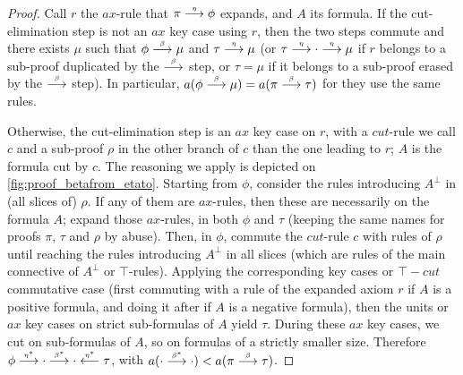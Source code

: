 \documentclass{lmcs}
\newcommand*{\orth}{^\perp} %
\newenvironment{myscope}{
\begin{scope}[every node/.style={circle,thick,draw,minimum size=8mm,inner sep=0}, every edge/.style={->,draw=black,thick}, every path/.style={-,draw=black,thick}]
}{
\end{scope}
}
\newenvironment{myscopec}[1]{
\begin{scope}[every node/.style={circle,thick,draw=#1,minimum size=8mm,inner sep=0}, every edge/.style={->,draw=#1,thick}, every path/.style={draw=#1, thick}]
\color{#1}
}{
\end{scope}
}
\newcommand{\edgelabel}[1]{edge node[draw=none, sloped, align=center]{#1 \\}}
\newcommand{\symboltext}[2]{\mathrel{\overset{\makebox[0pt]{\mbox{\normalfont\tiny\sffamily \ensuremath{#1}}}}{#2}}} %
\newcommand{\etato}{\symboltext{\eta}{\longrightarrow}}
\newcommand{\etatostar}{\symboltext{\eta^*}{\longrightarrow}}
\newcommand{\etafromstar}{\symboltext{\eta^*}{\longleftarrow}}
\newcommand{\betato}{\symboltext{\beta}{\longrightarrow}}
\newcommand{\betatostar}{\symboltext{\beta^*}{\longrightarrow}}
\begin{document}
\begin{lem}
\begin{center}
\end{center}
\end{lem}
\begin{proof}
Call $r$ the $ax$-rule that $\pi\etato\phi$ expands, and $A$ its formula.
If the cut-elimination step is not an $ax$ key case using $r$, then the two steps commute and there exists $\mu$ such that $\phi\betato\mu$ and $\tau\etato\mu$ (or $\tau\etato\cdot\etato\mu$ if $r$ belongs to a sub-proof duplicated by the $\betato$ step, or $\tau=\mu$ if it belongs to a sub-proof erased by the $\betato$ step).
In particular, $a(\phi\betato\mu)=a(\pi\betato\tau)$ for they use the same rules.

Otherwise, the cut-elimination step is an $ax$ key case on $r$, with a $cut$-rule we call $c$ and a sub-proof $\rho$ in the other branch of $c$ than the one leading to $r$; $A$ is the formula cut by $c$.
The reasoning we apply is depicted on \autoref{fig:proof_betafrom_etato}.
Starting from $\phi$, consider the rules introducing $A\orth$ in (all slices of) $\rho$.
If any of them are $ax$-rules, then these are necessarily on the formula $A$; expand those $ax$-rules, in both $\phi$ and $\tau$ (keeping the same names for proofs $\pi$, $\tau$ and $\rho$ by abuse).
Then, in $\phi$, commute the $cut$-rule $c$ with rules of $\rho$ until reaching the rules introducing $A\orth$ in all slices (which are rules of the main connective of $A\orth$ or $\top$-rules).
Applying the corresponding key cases or $\top-cut$ commutative case (first commuting with a rule of the expanded axiom $r$ if $A$ is a positive formula, and doing it after if $A$ is a negative formula), then the units or $ax$ key cases on strict sub-formulas of $A$ yield $\tau$.
During these $ax$ key cases, we cut on sub-formulas of $A$, so on formulas of a strictly smaller size.
Therefore $\phi\etatostar\cdot\betatostar\cdot\etafromstar\tau$, with $a(\cdot\betatostar\cdot) < a(\pi\betato\tau)$.
\end{proof}
\end{document}

